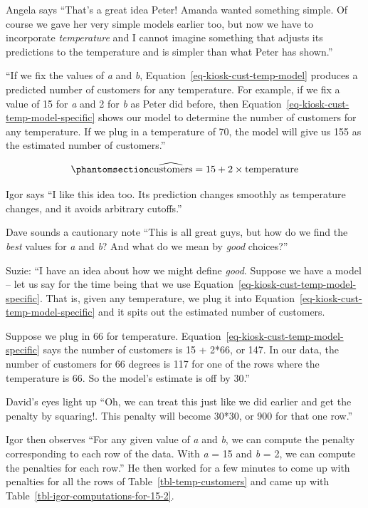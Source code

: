 \documentclass[
  12pt,
  letterpaper,
  DIV=11,
  numbers=noendperiod]{scrreprt}
\begin{document}
Angela says ``That's a great idea Peter! Amanda wanted something simple.
Of course we gave her very simple models earlier too, but now we have to
incorporate \emph{temperature} and I cannot imagine something that
adjusts its predictions to the temperature and is simpler than what
Peter has shown.''

``If we fix the values of \emph{a} and \emph{b},
Equation~\ref{eq-kiosk-cust-temp-model} produces a predicted number of
customers for any temperature. For example, if we fix a value of 15 for
\emph{a} and 2 for \emph{b} as Peter did before, then
Equation~\ref{eq-kiosk-cust-temp-model-specific} shows our model to
determine the number of customers for any temperature. If we plug in a
temperature of 70, the model will give us 155 as the estimated number of
customers.''

\begin{equation}\phantomsection\label{eq-kiosk-cust-temp-model-specific}{
\widehat{\text{customers}} = 15 +  2\times\text{temperature}
}\end{equation}

Igor says ``I like this idea too. Its prediction changes smoothly as
temperature changes, and it avoids arbitrary cutoffs.''

Dave sounds a cautionary note ``This is all great guys, but how do we
find the \emph{best} values for \emph{a} and \emph{b}? And what do we
mean by \emph{good} choices?''

Suzie: ``I have an idea about how we might define \emph{good}. Suppose
we have a model -- let us say for the time being that we use
Equation~\ref{eq-kiosk-cust-temp-model-specific}. That is, given any
temperature, we plug it into
Equation~\ref{eq-kiosk-cust-temp-model-specific} and it spits out the
estimated number of customers.

Suppose we plug in 66 for temperature.
Equation~\ref{eq-kiosk-cust-temp-model-specific} says the number of
customers is 15 + 2*66, or 147. In our data, the number of customers for
66 degrees is 117 for one of the rows where the temperature is 66. So
the model's estimate is off by 30.''

David's eyes light up ``Oh, we can treat this just like we did earlier
and get the penalty by squaring!. This penalty will become 30*30, or 900
for that one row.''

Igor then observes ``For any given value of \emph{a} and \emph{b}, we
can compute the penalty corresponding to each row of the data. With
\emph{a} = 15 and \emph{b} = 2, we can compute the penalties for each
row.'' He then worked for a few minutes to come up with penalties for
all the rows of Table~\ref{tbl-temp-customers} and came up with
Table~\ref{tbl-igor-computations-for-15-2}.
\end{document}
